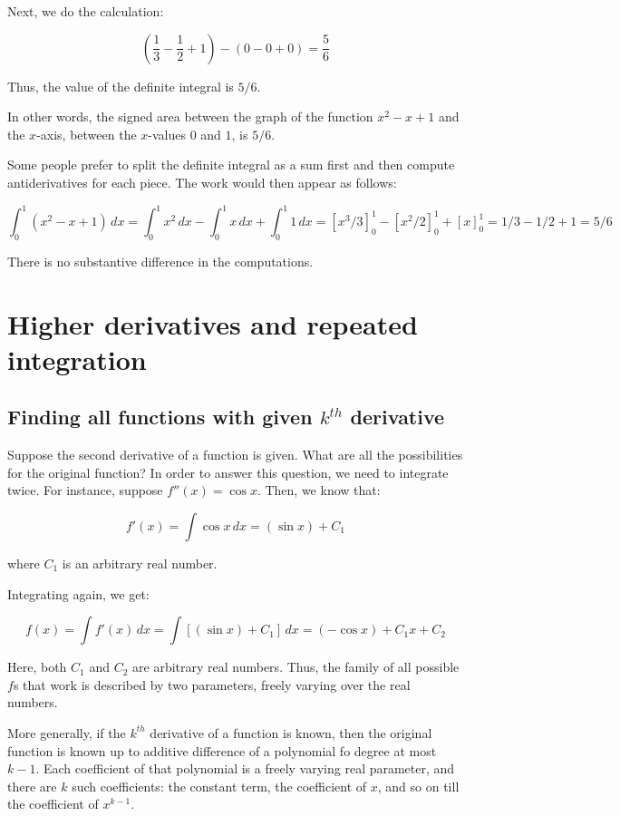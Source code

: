\documentclass[10pt]{amsart}
\begin{document}
Next, we do the calculation:

$$\left(\frac{1}{3} - \frac{1}{2} + 1\right) - (0 - 0 + 0) = \frac{5}{6}$$

Thus, the value of the definite integral is $5/6$.

In other words, the signed area between the graph of the function $x^2
- x + 1$ and the $x$-axis, between the $x$-values $0$ and $1$, is $5/6$.

Some people prefer to split the definite integral as a sum first and
then compute antiderivatives for each piece. The work would then
appear as follows:

$$\int_0^1 (x^2 - x + 1) \, dx = \int_0^1 x^2 \, dx - \int_0^1 x \, dx + \int_0^1 1 \, dx = [x^3/3]_0^1 - [x^2/2]_0^1 + [x]_0^1 = 1/3 - 1/2 + 1 = 5/6$$

There is no substantive difference in the computations.

\section{Higher derivatives and repeated integration}

\subsection{Finding all functions with given $k^{th}$ derivative}

Suppose the second derivative of a function is given. What are all the
possibilities for the original function? In order to answer this
question, we need to integrate twice. For instance, suppose $f''(x) =
\cos x$. Then, we know that:

$$f'(x) = \int \cos x \, dx = (\sin x) + C_1$$

where $C_1$ is an arbitrary real number.

Integrating again, we get:

$$f(x) = \int f'(x) \, dx = \int [(\sin x) + C_1] \, dx = (- \cos x) + C_1x + C_2$$

Here, both $C_1$ and $C_2$ are arbitrary real numbers. Thus, the
family of all possible $f$s that work is described by two parameters,
freely varying over the real numbers.

More generally, if the $k^{th}$ derivative of a function is known,
then the original function is known up to additive difference of a
polynomial fo degree at most $k - 1$. Each coefficient of that
polynomial is a freely varying real parameter, and there are $k$ such
coefficients: the constant term, the coefficient of $x$, and so on
till the coefficient of $x^{k-1}$.
\end{document}
